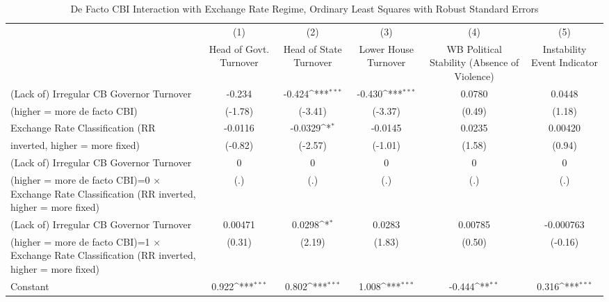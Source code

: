 \begin{table}[htbp]\centering
\def\sym#1{\ifmmode^{#1}\else\(^{#1}\)\fi}
\caption{De Facto CBI Interaction with Exchange Rate Regime, Ordinary Least Squares with Robust Standard Errors \label{imultIndOLSDF}}
\begin{tabular}{l*{5}{c}}
\toprule
                                        &\multicolumn{1}{c}{(1)}&\multicolumn{1}{c}{(2)}&\multicolumn{1}{c}{(3)}&\multicolumn{1}{c}{(4)}&\multicolumn{1}{c}{(5)}\\
                                        &\multicolumn{1}{c}{Head of Govt. Turnover}&\multicolumn{1}{c}{Head of State Turnover}&\multicolumn{1}{c}{Lower House Turnover}&\multicolumn{1}{c}{WB Political Stability (Absence of Violence)}&\multicolumn{1}{c}{Instability Event Indicator}\\
\midrule
(Lack of) Irregular CB Governor Turnover&    -0.234         &    -0.424\sym{***}&    -0.430\sym{***}&    0.0780         &    0.0448         \\
(higher = more de facto CBI)            &   (-1.78)         &   (-3.41)         &   (-3.37)         &    (0.49)         &    (1.18)         \\
\addlinespace
Exchange Rate Classification (RR        &   -0.0116         &   -0.0329\sym{*}  &   -0.0145         &    0.0235         &   0.00420         \\
inverted, higher = more fixed)          &   (-0.82)         &   (-2.57)         &   (-1.01)         &    (1.58)         &    (0.94)         \\
\addlinespace
(Lack of) Irregular CB Governor Turnover&         0         &         0         &         0         &         0         &         0         \\
(higher = more de facto CBI)=0 $\times$ Exchange Rate Classification (RR inverted, higher = more fixed)&       (.)         &       (.)         &       (.)         &       (.)         &       (.)         \\
\addlinespace
(Lack of) Irregular CB Governor Turnover&   0.00471         &    0.0298\sym{*}  &    0.0283         &   0.00785         & -0.000763         \\
(higher = more de facto CBI)=1 $\times$ Exchange Rate Classification (RR inverted, higher = more fixed)&    (0.31)         &    (2.19)         &    (1.83)         &    (0.50)         &   (-0.16)         \\
\addlinespace
Constant                                &     0.922\sym{***}&     0.802\sym{***}&     1.008\sym{***}&    -0.444\sym{**} &     0.316\sym{***}\\

\end{tabular}
\end{table}
